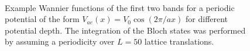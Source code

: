 \begin{figure}
    \\
    \caption{Example Wannier functions of the first two bands for a periodic potential of the form $V_{ae}(x)=V_0\cos(2\pi/ax)$ for different potential depth. The integration of the Bloch states was performed by assuming a periodicity over $L=50$ lattice translations.}
    \label{fig:tight_binding_wanniers}
\end{figure}

